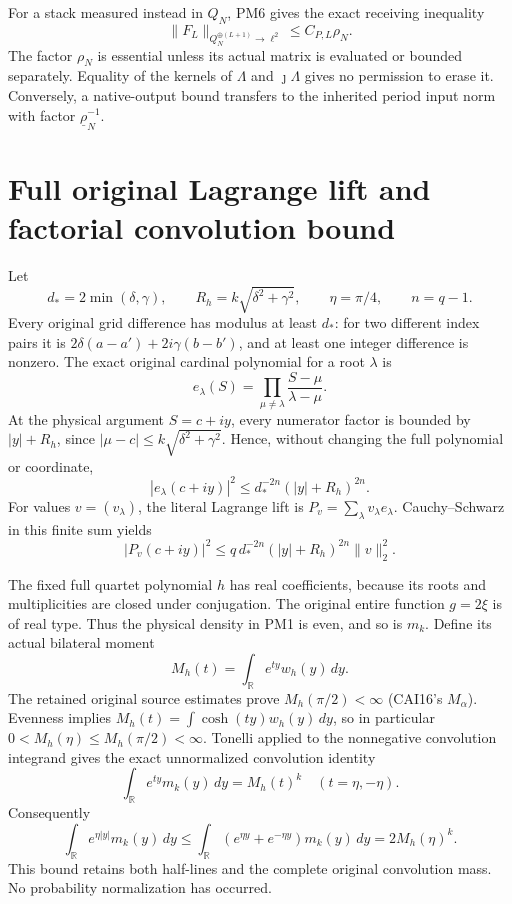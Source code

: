 \documentclass[11pt]{article}
\newcommand{\R}{\mathbb R}
\begin{document}
For a stack measured instead in $Q_N$, PM6 gives the exact
receiving inequality
\[
 \boxed{\|F_L\|_{Q_N^{\oplus(L+1)}\to\ell^2}
                      \le C_{P,L}\rho_N.}                     \tag{PM11}
\]
The factor $\rho_N$ is essential unless its actual matrix is
evaluated or bounded separately.  Equality of the kernels of
$\Lambda$ and $\jmath\Lambda$ gives no permission to erase it.
Conversely, a native-output bound transfers to the inherited
period input norm with factor $\underline\rho_N^{-1}$.

\section{Full original Lagrange lift and factorial convolution bound}
Let
\[
 d_*=2\min(\delta,\gamma),\qquad
 R_h=k\sqrt{\delta^2+\gamma^2},\qquad
 \eta=\pi/4,\qquad n=q-1.                                     \tag{PM12}
\]
Every original grid difference has modulus at least $d_*$:
for two different index pairs it is
$2\delta(a-a')+2i\gamma(b-b')$, and at least one integer
difference is nonzero.  The exact original cardinal polynomial
for a root $\lambda$ is
\[
 e_\lambda(S)=\prod_{\mu\ne\lambda}
                         \frac{S-\mu}{\lambda-\mu}.
\]
At the physical argument $S=c+iy$, every numerator factor is
bounded by $|y|+R_h$, since
$|\mu-c|\le k\sqrt{\delta^2+\gamma^2}$.  Hence, without changing
the full polynomial or coordinate,
\[
 |e_\lambda(c+iy)|^2
              \le d_*^{-2n}(|y|+R_h)^{2n}.                     \tag{PM13}
\]
For values $v=(v_\lambda)$, the literal Lagrange lift is
$P_v=\sum_\lambda v_\lambda e_\lambda$.  Cauchy--Schwarz in
this finite sum yields
\[
 |P_v(c+iy)|^2\le q\,d_*^{-2n}(|y|+R_h)^{2n}\|v\|_2^2.       \tag{PM14}
\]

The fixed full quartet polynomial $h$ has real coefficients,
because its roots and multiplicities are closed under conjugation.
The original entire function $g=2\xi$ is of real type.  Thus the
physical density in PM1 is even, and so is $m_k$.  Define its
actual bilateral moment
\[
 M_h(t)=\int_\R e^{ty}w_h(y)\,dy.
\]
The retained original source estimates prove
$M_h(\pi/2)<\infty$ (CAI16's $M_\alpha$).  Evenness implies
$M_h(t)=\int\cosh(ty)w_h(y)\,dy$, so in particular
$0<M_h(\eta)\le M_h(\pi/2)<\infty$.
Tonelli applied to the nonnegative convolution integrand gives
the exact unnormalized convolution identity
\[
 \int_\R e^{ty}m_k(y)\,dy=M_h(t)^k\quad(t=\eta,-\eta).
                                                                    \tag{PM15}
\]
Consequently
\[
 \int_\R e^{\eta|y|}m_k(y)\,dy
 \le\int_\R(e^{\eta y}+e^{-\eta y})m_k(y)\,dy
             =2M_h(\eta)^k.                                   \tag{PM16}
\]
This bound retains both half-lines and the complete original
convolution mass.  No probability normalization has occurred.
\end{document}

